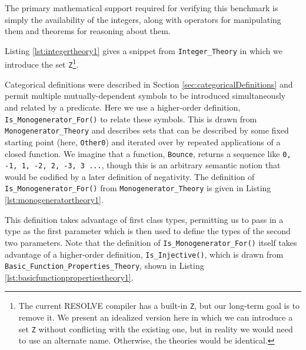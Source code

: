 The primary mathematical support required for verifying this benchmark is simply the availability of the integers, along with operators for manipulating them and theorems for reasoning about them.

Listing \ref{lst:integertheory1} gives a snippet from \texttt{Integer\_Theory} in which we introduce the set \texttt{Z}\footnote{The current RESOLVE compiler has a built-in \texttt{Z}, but our long-term goal is to remove it.  We present an idealized version here in which we can introduce a set \texttt{Z} without conflicting with the existing one, but in reality we would need to use an alternate name.  Otherwise, the theories would be identical.}.



Categorical definitions were described in Section \ref{sec:categoricalDefinitions} and permit multiple mutually-dependent symbols to be introduced simultaneously and related by a predicate.  Here we use a higher-order definition, \texttt{Is\_Monogenerator\_For()} to relate these symbols.  This is drawn from \texttt{Monogenerator\_Theory} and describes sets that can be described by some fixed starting point (here, \texttt{Other0}) and iterated over by repeated applications of a closed function.  We imagine that a function, \texttt{Bounce}, returns a sequence like \texttt{0, -1, 1, -2, 2, -3, 3 ...}, though this is an arbitrary semantic notion that would be codified by a later definition of negativity.  The definition of \texttt{Is\_Monogenerator\_For()} from \texttt{Monogenerator\_Theory} is given in Listing \ref{lst:monogeneratortheory1}.



This definition takes advantage of first class types, permitting us to pass in a type as the first parameter which is then used to define the types of the second two parameters.  Note that the definition of \texttt{Is\_Monogenerator\_For()} itself takes advantage of a higher-order definition, \texttt{Is\_Injective()}, which is drawn from \texttt{Basic\_Function\_Properties\_Theory}, shown in Listing \ref{lst:basicfunctionpropertiestheory1}.



